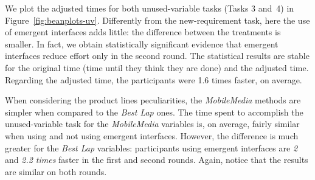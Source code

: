 






We plot the adjusted times for both unused-variable tasks (Tasks 3 and~4) in Figure~\ref{fig:beanplots-uv}. Differently from the new-requirement task, here the use of emergent interfaces adds little: the difference between the treatments is smaller. In fact, we obtain statistically significant evidence that emergent interfaces reduce effort only in the second round. The statistical results are stable for the original time (time until they think they are done) and the adjusted time. Regarding the adjusted time, the participants were {1.6 times} faster, on average.


When considering the product lines peculiarities, the \textit{MobileMedia} methods are simpler when compared to the \textit{Best Lap} ones. The time spent to accomplish the unused-variable task for the \textit{MobileMedia} variables is, on average, fairly similar when using and not using emergent interfaces. However, the difference is much greater for the \textit{Best Lap} variables: participants using emergent interfaces are \textit{2} and \textit{2.2 times} faster in the first and second rounds. Again, notice that the results are similar on both rounds.

